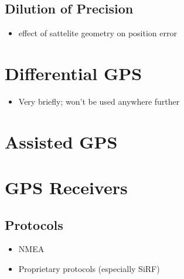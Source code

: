 \subsection{Dilution of Precision}
\begin{itemize}
\item effect of sattelite geometry on position error
\end{itemize}

\section{Differential GPS}
\begin{itemize}
\item Very briefly; won't be used anywhere further
\end{itemize}

\section{Assisted GPS}

\section{GPS Receivers}
\subsection{Protocols}
\begin{itemize}
\item NMEA
\item Proprietary protocols (especially SiRF)
\end{itemize}


